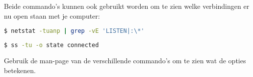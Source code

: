 Beide commando's kunnen ook gebruikt worden om te zien welke verbindingen er nu open staan met je computer:
\begin{lstlisting}[language=bash]
$ netstat -tuanp | grep -vE 'LISTEN|:\*'
\end{lstlisting}
\begin{lstlisting}[language=bash]
$ ss -tu -o state connected
\end{lstlisting}
Gebruik de man-page van de verschillende commando's om te zien wat de opties betekenen.

